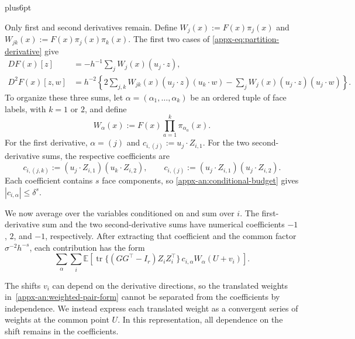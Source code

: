 \documentclass[11pt,letterpaper,twoside,leqno]{article}
\makeatletter
\theoremstyle{bookplain}
\theoremstyle{bookremark}
\renewenvironment{proof}[1][\proofname]{\par
  \pushQED{\qed}\normalfont\topsep6pt plus6pt\relax
  \trivlist\item[\hskip\labelsep\bfseries #1\@addpunct{.}]\ignorespaces
}{\popQED\endtrivlist\@endpefalse}
\newcommand{\E}{\mathbb E}
\newcommand{\tr}{\operatorname{tr}}
\makeatother
\begin{document}
\begin{proof}
Only first and second derivatives remain. Define
$W_j(x):=F(x)\pi_j(x)$ and
$W_{jk}(x):=F(x)\pi_j(x)\pi_k(x)$. The first two cases of
\eqref{appx-eq:partition-derivative} give
\begin{align*}
 DF(x)[z]&=-h^{-1}\sum_jW_j(x)(u_j\cdot z),\\
 D^2F(x)[z,w]&=h^{-2}\left\{
       2\sum_{j,k}W_{jk}(x)(u_j\cdot z)(u_k\cdot w)
       -\sum_jW_j(x)(u_j\cdot z)(u_j\cdot w)\right\}.
\end{align*}
To organize these three sums, let
$\alpha=(\alpha_1,\ldots,\alpha_k)$ be an ordered tuple of face
labels, with $k=1$ or $2$, and define
\[
 W_\alpha(x):=F(x)\prod_{a=1}^k\pi_{\alpha_a}(x).
\]
For the first derivative, $\alpha=(j)$ and
$c_{i,(j)}:=u_j\cdot Z_{i,1}$. For the two second-derivative
sums, the respective coefficients are
\[
 c_{i,(j,k)}:=(u_j\cdot Z_{i,1})(u_k\cdot Z_{i,2}),
 \qquad
 c_{i,(j)}:=(u_j\cdot Z_{i,1})(u_j\cdot Z_{i,2}).
\]
Each coefficient contains $s$ face components, so
\eqref{appx-an:conditional-budget} gives
$|c_{i,\alpha}|\le\delta^s$.

We now average over the variables conditioned on and sum over
$i$. The first-derivative sum and the two second-derivative sums
have numerical coefficients $-1$, $2$, and $-1$, respectively.
After extracting that coefficient and the common factor
$\sigma^{-2}h^{-s}$, each contribution has the form
\begin{equation}
 \sum_\alpha\sum_i\E\left[
  \tr\{(GG^\top-I_r)Z_iZ_i^\top\}\,
       c_{i,\alpha}W_\alpha(U+v_i)\right].
 \label{appx-an:weighted-pair-form}
\end{equation}

The shifts $v_i$ can depend on the derivative directions, so the
translated weights in~\eqref{appx-an:weighted-pair-form} cannot
be separated from the coefficients by independence. We instead
express each translated weight as a convergent series of weights
at the common point $U$. In this representation, all dependence
on the shift remains in the coefficients.


\end{proof}
\end{document}
